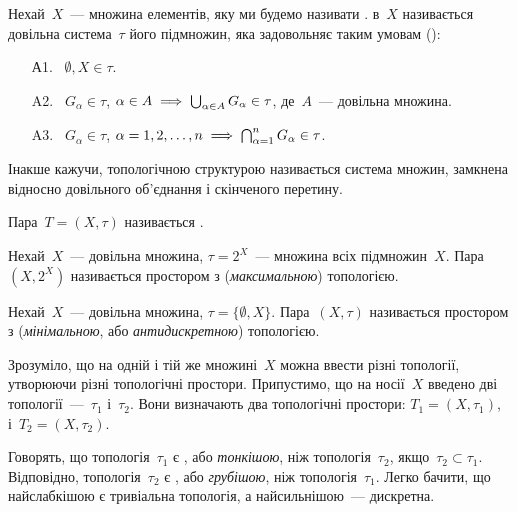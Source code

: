 \begin{definition}
    Нехай~$X$~--- множина елементів, яку ми будемо називати .  в~$X$ називається довільна система~$\tau$ його підмножин, яка задовольняє таким умовам ():
    \begin{enumerate}
        \item[А1.]~$\emptyset, X \in \tau$.
        \item[A2.]~$G_\alpha \in \tau$, $\alpha \in A \implies \operatorname*{\bigcup}_{\alpha \in A} G_\alpha \in \tau$, де~$A$~--- довільна множина.
        \item[A3.]~$G_\alpha \in \tau$, $\alpha = 1, 2, \dots, n \implies \operatorname*{\bigcap}_{\alpha = 1}^n G_\alpha \in \tau$.
    \end{enumerate}
\end{definition}

Інакше кажучи, топологічною структурою називається система множин, замкнена відносно довільного об'єднання і скінченого перетину.

\begin{definition}
    Пара~$T = (X, \tau)$ називається .
\end{definition}

\begin{example}
    Нехай~$X$~--- довільна множина, $\tau = 2^X$~--- множина всіх підмножин~$X$. Пара~$(X, 2^X)$ називається простором з  (\emph{максимальною}) топологією.
\end{example}

\begin{example}
    Нехай~$X$~--- довільна множина, $\tau = \{\emptyset, X\}$. Пара~$(X, \tau)$ називається простором з  (\emph{мінімальною}, або \emph{антидискретною}) топологією.
\end{example}

Зрозуміло, що на одній і тій же множині~$X$ можна ввести різні топології, утворюючи різні топологічні простори. Припустимо, що на носії~$X$ введено дві топології~---~$\tau_1$ і~$\tau_2$. Вони визначають два топологічні простори: $T_1 = (X, \tau_1)$, і~$T_2 = (X, \tau_2)$.

\begin{definition}
    Говорять, що топологія~$\tau_1$ є , або \emph{тонкішою}, ніж топологія~$\tau_2$, якщо~$\tau_2 \subset \tau_1$. Відповідно, топологія~$\tau_2$ є , або \emph{грубішою}, ніж топологія~$\tau_1$. Легко бачити, що найслабкішою є тривіальна топологія, а найсильнішою~--- дискретна.
\end{definition}

